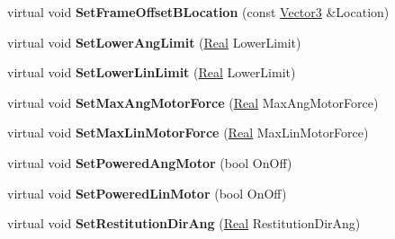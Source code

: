 \begin{DoxyCompactItemize}
\item 
\hypertarget{classphys_1_1SliderConstraint_ac3ebd4a2e8af9a50e1a910050e8ed9f9}{
virtual void {\bfseries SetFrameOffsetBLocation} (const \hyperlink{classphys_1_1Vector3}{Vector3} \&Location)}
\label{classphys_1_1SliderConstraint_ac3ebd4a2e8af9a50e1a910050e8ed9f9}

\item 
\hypertarget{classphys_1_1SliderConstraint_a81933eb795ec4fb7d5172e68a023071b}{
virtual void {\bfseries SetLowerAngLimit} (\hyperlink{namespacephys_af7eb897198d265b8e868f45240230d5f}{Real} LowerLimit)}
\label{classphys_1_1SliderConstraint_a81933eb795ec4fb7d5172e68a023071b}

\item 
\hypertarget{classphys_1_1SliderConstraint_a159e545dcae060c36be16ff00748f259}{
virtual void {\bfseries SetLowerLinLimit} (\hyperlink{namespacephys_af7eb897198d265b8e868f45240230d5f}{Real} LowerLimit)}
\label{classphys_1_1SliderConstraint_a159e545dcae060c36be16ff00748f259}

\item 
\hypertarget{classphys_1_1SliderConstraint_acd6db1bc63c9c2e5b1572ffed38405cf}{
virtual void {\bfseries SetMaxAngMotorForce} (\hyperlink{namespacephys_af7eb897198d265b8e868f45240230d5f}{Real} MaxAngMotorForce)}
\label{classphys_1_1SliderConstraint_acd6db1bc63c9c2e5b1572ffed38405cf}

\item 
\hypertarget{classphys_1_1SliderConstraint_ab2f02e7627457661e75c6a6ace1b1b92}{
virtual void {\bfseries SetMaxLinMotorForce} (\hyperlink{namespacephys_af7eb897198d265b8e868f45240230d5f}{Real} MaxLinMotorForce)}
\label{classphys_1_1SliderConstraint_ab2f02e7627457661e75c6a6ace1b1b92}

\item 
\hypertarget{classphys_1_1SliderConstraint_a7bc47cdcaa399ae12e8282b4d8fa0361}{
virtual void {\bfseries SetPoweredAngMotor} (bool OnOff)}
\label{classphys_1_1SliderConstraint_a7bc47cdcaa399ae12e8282b4d8fa0361}

\item 
\hypertarget{classphys_1_1SliderConstraint_aa7c6ac747fda97d1d0b9d708b557c104}{
virtual void {\bfseries SetPoweredLinMotor} (bool OnOff)}
\label{classphys_1_1SliderConstraint_aa7c6ac747fda97d1d0b9d708b557c104}

\item 
\hypertarget{classphys_1_1SliderConstraint_a67e21b995d6fe56d7f8eccfc7d37d96d}{
virtual void {\bfseries SetRestitutionDirAng} (\hyperlink{namespacephys_af7eb897198d265b8e868f45240230d5f}{Real} RestitutionDirAng)}
\label{classphys_1_1SliderConstraint_a67e21b995d6fe56d7f8eccfc7d37d96d}


\end{DoxyCompactItemize}
